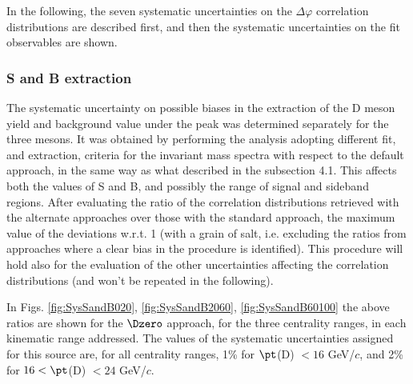 In the following, the seven systematic uncertainties on the $\Delta\varphi$ correlation distributions are described first, and then the systematic uncertainties on the fit observables are shown.

\subsubsection{S and B extraction}
The systematic uncertainty on possible biases in the extraction of the D meson yield and background value under the peak was determined separately for the three mesons. It was obtained by performing the analysis adopting different fit, and extraction, criteria for the invariant mass spectra with respect to the default approach, in the same way as what described in the subsection 4.1. This affects both the values of S and B, and possibly the range of signal and sideband regions.
After evaluating the ratio of the correlation distributions retrieved with the alternate approaches over those with the standard approach, the maximum value of the deviations w.r.t. 1 (with a grain of salt, i.e. excluding the ratios from approaches where a clear bias in the procedure is identified).
This procedure will hold also for the evaluation of the other uncertainties affecting the correlation distributions (and won't be repeated in the following).

In Figs. \ref{fig:SysSandB020}, \ref{fig:SysSandB2060}, \ref{fig:SysSandB60100} the above ratios are shown for the $\Dzero$ approach, for the three centrality ranges, in each kinematic range addressed. The values of the systematic uncertainties assigned for this source are, for all centrality ranges, 1\% for $\pt$(D) $< 16$ GeV/$c$, and 2\% for $16 < \pt$(D) $< 24$ GeV/$c$.

